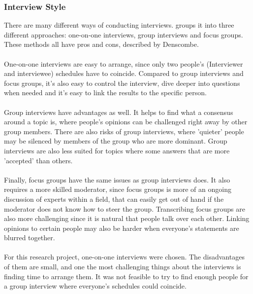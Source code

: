 \documentclass{cslthse-msc}
\begin{document}
    \subsubsection{Interview Style}
    There are many different ways of conducting interviews. \citet{denscombe} groups it into
    three different approaches: one-on-one interviews, group interviews and focus groups.
    These methods all have pros and cons, described by Denscombe.
    \\ \\
    One-on-one interviews are easy to arrange, since
    only two people's (Interviewer and interviewee) schedules have to coincide.
    Compared to group interviews and focus groups, it's also easy to control the interview,
    dive deeper into questions when needed and it's easy to link the results
    to the specific person.
    \\ \\
    Group interviews have advantages as well. It helps to find what a consensus around
    a topic is, where people's opinions can be challenged right away by other group members.
    There are also risks of group interviews, where 'quieter' people may be silenced by
    members of the group who are more dominant. Group interviews are also less suited
    for topics where some answers that are more 'accepted' than others.
    \\ \\
    Finally, focus groups have the same issues as group interviews does. It also
    requires a more skilled moderator, since focus groups is more of an ongoing
    discussion of experts within a field, that can easily get out of hand if the
    moderator does not know how to steer the group.  Transcribing focus groups are also
    more challenging since it is natural that people talk over each other. Linking opinions
    to certain people may also be harder when everyone's statements are blurred together.
    \\ \\
    For this research project, one-on-one interviews were chosen.
    The disadvantages of them are small, and one the most challenging things
    about the interviews is finding time to arrange them. It was not feasible
    to try to find enough people for a group interview where everyone's schedules
    could coincide.
\end{document}
